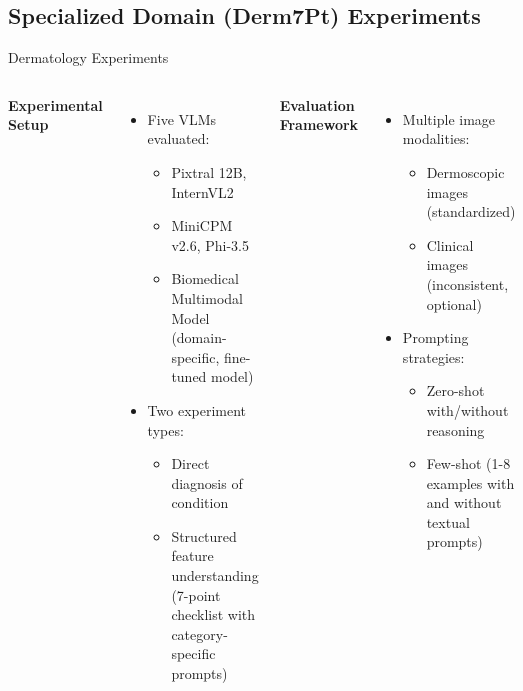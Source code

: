 \documentclass[aspectratio=169]{beamer}
\newcommand\customcolumnwidth{0.4625\textwidth}
\begin{document}
\subsection{Specialized Domain (Derm7Pt) Experiments}
\begin{frame}{Dermatology Experiments}
  \vspace{-1em}
  \begin{columns}[T]
    \column{\customcolumnwidth}
      \textbf{Experimental Setup}
      \begin{itemize}
        \item Five VLMs evaluated:
        \begin{itemize}
          \item Pixtral 12B, InternVL2
          \item MiniCPM v2.6, Phi-3.5
          \item Biomedical Multimodal Model (domain-specific, fine-tuned model)
        \end{itemize}
        \item Two experiment types:
        \begin{itemize}
          \item Direct diagnosis of condition
          \item Structured feature understanding (7-point checklist with category-specific prompts)
        \end{itemize}
      \end{itemize}
    \column{\customcolumnwidth}
      \textbf{Evaluation Framework}
      \begin{itemize}
        \item Multiple image modalities:
        \begin{itemize}
          \item Dermoscopic images (standardized)
          \item Clinical images (inconsistent, optional)
        \end{itemize}
        \item Prompting strategies:
        \begin{itemize}
          \item Zero-shot with/without reasoning
          \item Few-shot (1-8 examples with and without textual prompts)
        \end{itemize}
      \end{itemize}
    \end{columns}
\end{frame}
\end{document}
